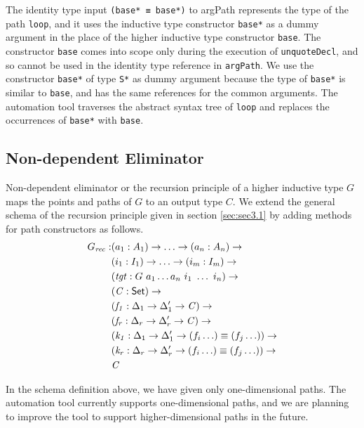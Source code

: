 \documentclass[sigplan,10pt]{acmart}
\begin{document}
The identity type input {\tt (base* ≡ base*)} to argPath represents the type of the path {\tt loop}, and it uses the inductive type constructor {\tt base*} as a dummy argument in the place of the higher inductive type constructor {\tt base}. The constructor {\tt base} comes into scope only during the execution of {\tt unquoteDecl}, and so cannot be used in the identity type reference in {\tt argPath}. We use the constructor {\tt base*} of type {\tt S*} as dummy argument because the type of {\tt base*} is similar to {\tt base}, and has the same references for the common arguments. The automation tool traverses the abstract syntax tree of {\tt loop} and replaces the occurrences of {\tt base*} with {\tt base}.

\subsection{Non-dependent Eliminator}
\label{sec:sec4.2}

Non-dependent eliminator or the recursion principle of a higher inductive type $G$ maps the points and paths of $G$ to an output type $C$. We extend the general schema of the recursion principle given in section \eqref{sec:sec3.1} by adding methods for path constructors as follows.
\begin{align*}
G_{\mathit{rec}} : & (a_1 : A_1) \to \ldots \to (a_n : A_n) \to\\
& (i_1 : I_1) \to \ldots \to (i_m : I_m) \to\\
& (\mathit{tgt} : G\ a_1 \ldots a_n\ i_1\ \ldots\ i_n) \to\\
& (\mathit{C} : \textsf{Set}{}) \to \\
& (\mathit{f_1} : \Delta_1 \to  \Delta_1^\prime \to \mathit{C}) \to \\
& (\mathit{f_r} : \Delta_r \to  \Delta_r^\prime \to \mathit{C}) \to \\
& (\mathit{k_1} : \Delta_1 \to  \Delta_1^\prime \to (f_i \ldots) \equiv (f_j \ldots)) \to \\
& (\mathit{k_r} : \Delta_r \to  \Delta_r^\prime \to (f_i \ldots) \equiv (f_j \ldots)) \to \\
& \mathit{C}
\end{align*}
 
In the schema definition above, we have given only one-dimensional paths. The automation tool currently supports one-dimensional paths, and we are planning to improve the tool to support higher-dimensional paths in the future. 
\end{document}
